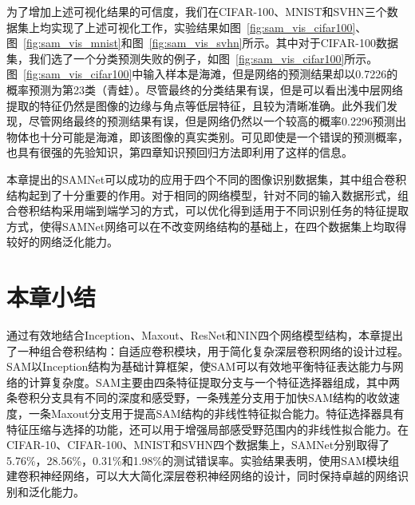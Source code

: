 为了增加上述可视化结果的可信度，我们在CIFAR-100、MNIST和SVHN三个数据集上均实现了上述可视化工作，实验结果如图~\ref{fig:sam_vis_cifar100}、图~\ref{fig:sam_vis_mnist}和图~\ref{fig:sam_vis_svhn}所示。其中对于CIFAR-100数据集，我们选了一个分类预测失败的例子，如图~\ref{fig:sam_vis_cifar100}所示。图~\ref{fig:sam_vis_cifar100}中输入样本是海滩，但是网络的预测结果却以0.7226的概率预测为第23类（青蛙）。尽管最终的分类结果有误，但是可以看出浅中层网络提取的特征仍然是图像的边缘与角点等低层特征，且较为清晰准确。此外我们发现，尽管网络最终的预测结果有误，但是网络仍然以一个较高的概率0.2296预测出物体也十分可能是海滩，即该图像的真实类别。可见即使是一个错误的预测概率，也具有很强的先验知识，第四章知识预回归方法即利用了这样的信息。


本章提出的SAMNet可以成功的应用于四个不同的图像识别数据集，其中组合卷积结构起到了十分重要的作用。对于相同的网络模型，针对不同的输入数据形式，组合卷积结构采用端到端学习的方式，可以优化得到适用于不同识别任务的特征提取方式，使得SAMNet网络可以在不改变网络结构的基础上，在四个数据集上均取得较好的网络泛化能力。


\section{本章小结}
\label{sec:sap:conclusion}

通过有效地结合Inception、Maxout、ResNet和NIN四个网络模型结构，本章提出了一种组合卷积结构：自适应卷积模块，用于简化复杂深层卷积网络的设计过程。SAM以Inception结构为基础计算框架，使SAM可以有效地平衡特征表达能力与网络的计算复杂度。SAM主要由四条特征提取分支与一个特征选择器组成，其中两条卷积分支具有不同的深度和感受野，一条残差分支用于加快SAM结构的收敛速度，一条Maxout分支用于提高SAM结构的非线性特征拟合能力。特征选择器具有特征压缩与选择的功能，还可以用于增强局部感受野范围内的非线性拟合能力。在CIFAR-10、CIFAR-100、MNIST和SVHN四个数据集上，SAMNet分别取得了5.76\%，28.56\%，0.31\%和1.98\%的测试错误率。实验结果表明，使用SAM模块组建卷积神经网络，可以大大简化深层卷积神经网络的设计，同时保持卓越的网络识别和泛化能力。















